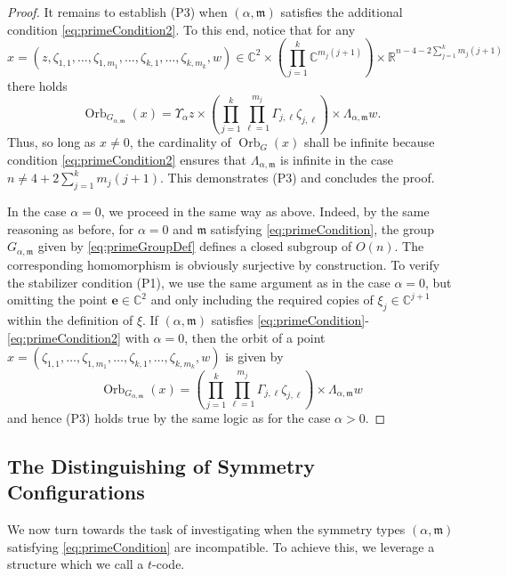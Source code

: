 \documentclass[10pt, reqno]{amsart}
\newcommand{\RR}{\mathbb{R}}
\newcommand{\CC}{\mathbb{C}}
\newcommand{\m}{\mathfrak{m}}
\numberwithin{equation}{section}
\theoremstyle{definition}
\theoremstyle{remark}
\theoremstyle{plain}
\begin{document}
\begin{proof}
		It remains to establish (P3) when $(\alpha,\m)$ satisfies the additional condition \eqref{eq:primeCondition2}. To this end, notice that for any 
		\begingroup
		\smaller
		\[x = (z, \zeta_{1,1},\dots,\zeta_{1,m_1}, \dots, \zeta_{k,1}, \dots, \zeta_{k,m_k}, w)
		\in \CC^2 \times\left(\prod_{j=1}^k\CC^{m_j(j+1)}\right)\times \RR^{n-4-2\sum_{j=1}^k m_j(j+1)} 
		\]
		\endgroup
		there holds
		\begin{equation}\label{eq:orbitForm}
			\operatorname{Orb}_{G_{\alpha,\m}}(x) = \Upsilon_\alpha z \times \left(\prod_{j=1}^k \prod_{\ell=1}^{m_j} \Gamma_{j,\ell} \zeta_{j,\ell}\right) \times \Lambda_{\alpha,\m} w.
		\end{equation}
		Thus, so long as $x \ne 0$, the cardinality of $\operatorname{Orb}_G(x)$ shall be infinite because condition \eqref{eq:primeCondition2} ensures that $\Lambda_{\alpha,\m}$ is infinite in the case $n \ne 4 + 2\sum_{j=1}^k m_j(j+1)$. This demonstrates (P3) and concludes the proof.
		
		In the case $\alpha =0$, we proceed in the same way as above. Indeed, by the same reasoning as before, for $\alpha =0$ and $\m$ satisfying \eqref{eq:primeCondition}, the group $G_{\alpha,\m}$ given by  \eqref{eq:primeGroupDef} defines a closed subgroup of $O(n)$. The corresponding homomorphism is obviously surjective by construction. To verify the stabilizer condition (P1), we use the same argument as in the case $\alpha = 0$, but omitting the point $\mathbf{e} \in \CC^2$ and only including the required copies of $\xi_j \in \CC^{j+1}$ within the definition of $\xi$. If $(\alpha,\m)$ satisfies \eqref{eq:primeCondition}-\eqref{eq:primeCondition2} with $\alpha=0$, then the orbit of a point $x = (\zeta_{1,1},\dots,\zeta_{1,m_1}, \dots, \zeta_{k,1}, \dots, \zeta_{k,m_k}, w)$ is given by
		\[ 	\operatorname{Orb}_{G_{\alpha,\m}}(x) = \left(\prod_{j=1}^k \prod_{\ell=1}^{m_j} \Gamma_{j,\ell} \zeta_{j,\ell}\right) \times \Lambda_{\alpha,\m} w
		\]
		and hence (P3) holds true by the same logic as for the case $\alpha > 0$.
	\end{proof}
	
	\subsection{The Distinguishing of Symmetry Configurations}
	We now turn towards the task of investigating when the symmetry types $(\alpha,\m)$ satisfying \eqref{eq:primeCondition} are incompatible. To achieve this, we leverage a structure which we call a $t$-code.
	
\end{document}
